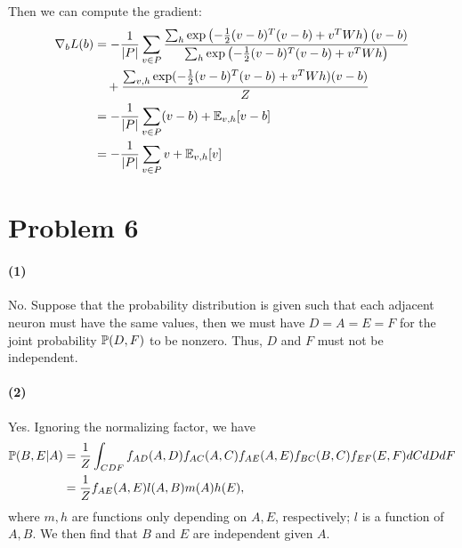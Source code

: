 \documentclass[a4 paper,12pt]{article}
\begin{document}
Then we can compute the gradient:
\begin{align*}
\nabla_bL(b)&=-\frac{1}{|P|}\sum_{v\in P}\frac{\sum_h\exp\left(-\frac{1}{2}(v-b)^T(v-b)+v^TWh\right)(v-b)}{\sum_h\exp\left(-\frac{1}{2}(v-b)^T(v-b)+v^TWh\right)}\\ &\quad +\frac{\sum_{v,h}\exp(-\frac{1}{2}(v-b)^T(v-b)+v^TWh)(v-b)}{Z}\\
&=-\frac{1}{|P|}\sum_{v\in P}(v-b)+\mathbb{E}_{v,h} [v-b]\\
&=-\frac{1}{|P|}\sum_{v\in P}v+\mathbb{E}_{v,h} [v]\\
\end{align*}
\section*{Problem 6}
\paragraph*{(1)}
No. Suppose that the probability distribution is given such that each adjacent neuron must have the same values, then we must have $D=A=E=F$ for the joint probability $\mathbb{P}(D,F)$ to be nonzero. Thus, $D$ and $F$ must not be independent.
\paragraph*{(2)}
Yes. Ignoring the normalizing factor, we have
\begin{align*}
\mathbb{P}(B,E|A)&=\frac{1}{Z}	\int_{CDF}f_{AD}(A,D)f_{AC}(A,C)f_{AE}(A,E)f_{BC}(B,C)f_{EF}(E,F)dCdDdF\\
&=\frac{1}{Z}f_{AE}(A,E)l(A,B)m(A)h(E),
\end{align*} where $m,h$ are functions only depending on $A,E$, respectively; $l$ is a function of $A,B$. We then find that $B$ and $E$ are independent given $A$.
\end{document}
